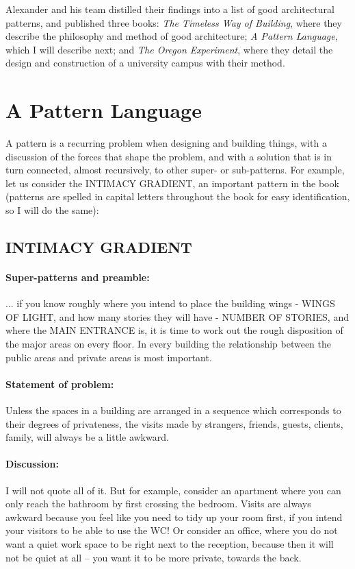 Alexander and his team distilled their findings into a list of good
architectural patterns, and published three books: \textit{The Timeless Way of
Building}, where they describe the philosophy and method of good architecture;
\textit{A Pattern Language}, which I will describe next; and \textit{The Oregon
Experiment}, where they detail the design and construction of a university
campus with their method.

\section*{A Pattern Language}

A pattern is a recurring problem when designing and building things, with a
discussion of the forces that shape the problem, and with a solution that is in
turn connected, almost recursively, to other super- or sub-patterns. For
example, let us consider the INTIMACY GRADIENT, an important pattern in the book
(patterns are spelled in capital letters throughout the book for easy
identification, so I will do the same):

\subsection*{INTIMACY GRADIENT}

\paragraph*{Super-patterns and preamble:}
... if you know roughly where you intend to place the building wings - WINGS OF
LIGHT, and how many stories they will have - NUMBER OF STORIES, and where the
MAIN ENTRANCE is, it is time to work out the rough disposition of the major
areas on every floor. In every building the relationship between the public
areas and private areas is most important.

\paragraph*{Statement of problem:}
Unless the spaces in a building are arranged in a sequence which corresponds to
their degrees of privateness, the visits made by strangers, friends, guests,
clients, family, will always be a little awkward.

\paragraph*{Discussion:}
I will not quote all of it. But for example, consider an apartment where you can
only reach the bathroom by first crossing the bedroom. Visits are always awkward
because you feel like you need to tidy up your room first, if you intend your
visitors to be able to use the WC! Or consider an office, where you do not want
a quiet work space to be right next to the reception, because then it will not
be quiet at all -- you want it to be more private, towards the back.

